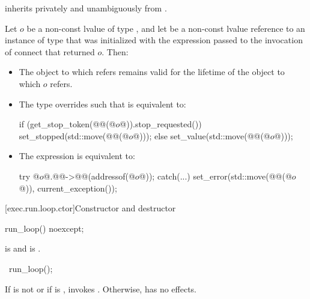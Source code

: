 \pnum
{}
inherits privately and unambiguously from .

\pnum
Let $o$ be a non-const lvalue of type ,
and let  be a non-const lvalue reference to an instance of type 
that was initialized with the expression 
passed to the invocation of connect that returned $o$.
Then:
\begin{itemize}
\item
The object to which  refers
remains valid for the lifetime of the object to which $o$ refers.
\item
The type  overrides
such that  is equivalent to:
\begin{codeblock}
if (get_stop_token(@@(@$o$@)).stop_requested()) {
  set_stopped(std::move(@@(@$o$@)));
} else {
  set_value(std::move(@@(@$o$@)));
}
\end{codeblock}
\item
The expression  is equivalent to:
\begin{codeblock}
try {
  @$o$@.@@->@@(addressof(@$o$@));
} catch(...) {
  set_error(std::move(@@(@$o$@)), current_exception());
}
\end{codeblock}
\end{itemize}

[exec.run.loop.ctor]{Constructor and destructor}

%
\begin{itemdecl}
run_loop() noexcept;
\end{itemdecl}

\begin{itemdescr}
\pnum
\ensures
{} is  and  is .
\end{itemdescr}

%
\begin{itemdecl}
~run_loop();
\end{itemdecl}

\begin{itemdescr}
\pnum
\effects
If  is not  or if  is ,
invokes .
Otherwise, has no effects.
\end{itemdescr}

